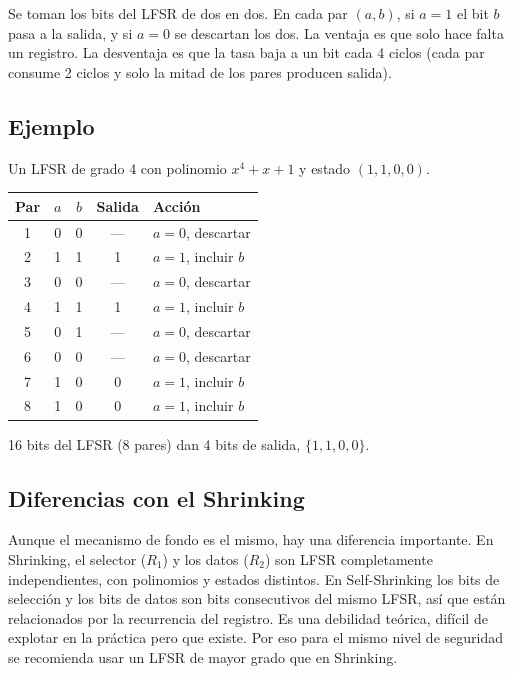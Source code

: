 Se toman los bits del LFSR de dos en dos. En cada par $(a, b)$, si $a = 1$ el bit $b$ pasa a la salida,
y si $a = 0$ se descartan los dos. La ventaja es que solo hace falta un registro.
La desventaja es que la tasa baja a un bit cada 4 ciclos (cada par consume 2 ciclos y solo la mitad de los pares producen salida).

\subsection{Ejemplo}

Un LFSR de grado 4 con polinomio $x^4 + x + 1$ y estado $(1, 1, 0, 0)$.

\begin{center}
\begin{tabular}{c|cc|c|l}
\hline
Par & $a$ & $b$ & Salida & Acción \\
\hline
1 & 0 & 0 & --- & $a=0$, descartar \\
2 & 1 & 1 & 1 & $a=1$, incluir $b$ \\
3 & 0 & 0 & --- & $a=0$, descartar \\
4 & 1 & 1 & 1 & $a=1$, incluir $b$ \\
5 & 0 & 1 & --- & $a=0$, descartar \\
6 & 0 & 0 & --- & $a=0$, descartar \\
7 & 1 & 0 & 0 & $a=1$, incluir $b$ \\
8 & 1 & 0 & 0 & $a=1$, incluir $b$ \\
\hline
\end{tabular}
\end{center}

16 bits del LFSR (8 pares) dan 4 bits de salida, $\{1, 1, 0, 0\}$.

\subsection{Diferencias con el Shrinking}

Aunque el mecanismo de fondo es el mismo, hay una diferencia importante.
En Shrinking, el selector ($R_1$) y los datos ($R_2$) son LFSR completamente independientes, con polinomios y estados distintos.
En Self-Shrinking los bits de selección y los bits de datos son bits consecutivos del mismo LFSR,
así que están relacionados por la recurrencia del registro.
Es una debilidad teórica, difícil de explotar en la práctica pero que existe.
Por eso para el mismo nivel de seguridad se recomienda usar un LFSR de mayor grado que en Shrinking.

